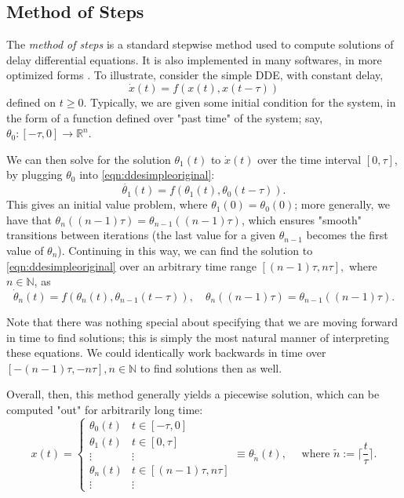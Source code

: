 \documentclass[12pt]{article}
\begin{document}
\subsection{Method of Steps}

The \emph{method of steps} is a standard stepwise method used to compute solutions of delay differential equations. It is also implemented in many softwares, in more optimized forms \cite{DDEtext}\cite{functionalDDEtext}\cite{ndsolvedde}. To illustrate, consider the simple DDE, with constant delay,
\begin{equation}\label{eqn:ddesimpleoriginal}
    \dot{x}(t) = f(x(t), x(t-\tau))
\end{equation}
defined on $t \geq 0$. Typically, we are given some initial condition for the system, in the form of a function defined over "past time" of the system; say, $\theta_0 : [- \tau, 0] \to \mathbb{R}^n$. 

We can then solve for the solution $\theta_1(t)$ to $\dot{x}(t)$ over the time interval $[0, \tau]$, by plugging $\theta_0$ into \cref{eqn:ddesimpleoriginal}:\begin{equation}
    \dot{\theta_1}(t) = f(\theta_1(t), \theta_0 (t - \tau)).
\end{equation}
This gives an initial value problem, where $\theta_1(0) = \theta_0(0)$; more generally, we have that $\theta_n((n-1)\tau) = \theta_{n-1}((n-1)\tau)$, which ensures "smooth" transitions between iterations (the last value for a given $\theta_{n-1}$ becomes the first value of $\theta_n$). Continuing in this way, we can find the solution to \cref{eqn:ddesimpleoriginal} over an arbitrary time range $[(n-1)\tau, n\tau],$ where $n \in \mathbb{N}$, as 
 \begin{equation}
    \dot{\theta}_n(t) = f(\theta_{n}(t), \theta_{n-1}(t-\tau)), \quad \theta_n((n-1)\tau) = \theta_{n-1}((n-1)\tau).
\end{equation}

Note that there was nothing special about specifying that we are moving forward in time to find solutions; this is simply the most natural manner of interpreting these equations. We could identically work backwards in time over $[-(n-1)\tau, -n \tau], n \in \mathbb{N}$ to find solutions then as well.

Overall, then, this method generally yields a piecewise solution, which can be computed "out" for arbitrarily long time:
\begin{equation}
    x(t) = \begin{cases}
        \theta_0(t) & t \in [- \tau, 0]\\
        \theta_1(t) & t \in [0, \tau]\\
        \vdots & \vdots \\
        \theta_n(t) & t \in [(n-1)\tau, n\tau]\\
        \vdots & \vdots
    \end{cases} \equiv \theta_{\tilde{n}}(t), \quad \text{ where } \tilde{n} :=  \lceil\frac{t}{\tau}\rceil.
\end{equation}
\end{document}
